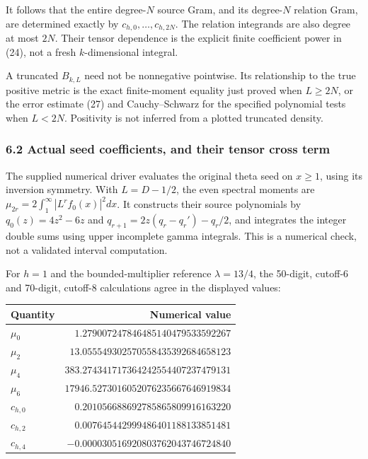 It follows that the entire degree-\(N\) source Gram, and its degree-\(N\) relation Gram, are
determined exactly by \(c_{h,0},\ldots,c_{h,2N}\). The relation integrands are also degree at most
\(2N\). Their tensor dependence is the explicit finite coefficient power in (24), not a fresh
\(k\)-dimensional integral.

A truncated \(B_{k,L}\) need not be nonnegative pointwise. Its relationship to the true positive
metric is the exact finite-moment equality just proved when \(L\ge2N\), or the error estimate (27)
and Cauchy--Schwarz for the specified polynomial tests when \(L<2N\). Positivity is not inferred
from a plotted truncated density.

\subsubsection{6.2 Actual seed coefficients, and their tensor cross
term}\label{gamma_convolution:actual-seed-coefficients-and-their-tensor-cross-term}

The supplied numerical driver evaluates the original theta seed on \(x\ge1\), using its inversion
symmetry. With \(L=D-1/2\), the even spectral moments are
\(\mu_{2r}=2\int_1^\infty |L^rf_0(x)|^2dx\). It constructs their source polynomials by
\(q_0(z)=4z^2-6z\) and \(q_{r+1}=2z(q_r-q_r')-q_r/2\), and integrates the integer double sums using
upper incomplete gamma integrals. This is a numerical check, not a validated interval computation.

For \(h=1\) and the bounded-multiplier reference \(\lambda=13/4\), the 50-digit, cutoff-6 and
70-digit, cutoff-8 calculations agree in the displayed values:

{\def\LTcaptype{none} %
\begin{longtable}[]{@{}lr@{}}
\toprule\noalign{}
Quantity & Numerical value \\
\midrule\noalign{}
\endhead
\bottomrule\noalign{}
\endlastfoot
\(\mu_0\) & \(1.279007247846485140479533592267\) \\
\(\mu_2\) & \(13.055549302570558435392684658123\) \\
\(\mu_4\) & \(383.274341717364242554407237479131\) \\
\(\mu_6\) & \(17946.5273016052076235667646919834\) \\
\(c_{h,0}\) & \(0.201056688692785865809916163220\) \\
\(c_{h,2}\) & \(0.007645442999486401188133851481\) \\
\(c_{h,4}\) & \(-0.000030516920803762043746724840\) \\
\end{longtable}
}

